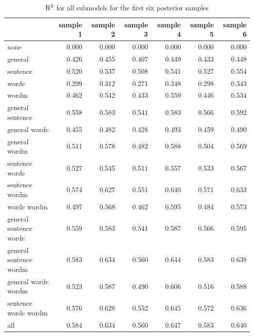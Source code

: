 \documentclass[11pt,a4paper,twoside]{book}\usepackage[]{graphicx}\usepackage[]{color}
\newenvironment{knitrout}{}{} %
\begin{document}
\begin{knitrout}
\color{fgcolor}\begin{table}

\caption{\label{tab:empirical.data.postsample3}$ \text{R}^2$ for all submodels for the first six posterior samples}
\centering
\begin{tabular}[t]{lrrrrrr}
\toprule
  & sample 1 & sample 2 & sample 3 & sample 4 & sample 5 & sample 6\\
\midrule
none & 0.000 & 0.000 & 0.000 & 0.000 & 0.000 & 0.000\\
general & 0.426 & 0.455 & 0.407 & 0.449 & 0.433 & 0.448\\
sentence & 0.520 & 0.537 & 0.508 & 0.541 & 0.527 & 0.554\\
wordc & 0.299 & 0.312 & 0.271 & 0.348 & 0.298 & 0.343\\
wordm & 0.462 & 0.542 & 0.433 & 0.559 & 0.446 & 0.534\\
general sentence & 0.558 & 0.583 & 0.541 & 0.583 & 0.566 & 0.592\\
general wordc & 0.455 & 0.482 & 0.428 & 0.493 & 0.459 & 0.490\\
general wordm & 0.511 & 0.578 & 0.482 & 0.588 & 0.504 & 0.569\\
sentence wordc & 0.527 & 0.545 & 0.511 & 0.557 & 0.533 & 0.567\\
sentence wordm & 0.574 & 0.627 & 0.551 & 0.640 & 0.571 & 0.633\\
wordc wordm & 0.497 & 0.568 & 0.462 & 0.595 & 0.484 & 0.573\\
general sentence wordc & 0.559 & 0.583 & 0.541 & 0.587 & 0.566 & 0.595\\
general sentence wordm & 0.583 & 0.634 & 0.560 & 0.644 & 0.583 & 0.638\\
general wordc wordm & 0.523 & 0.587 & 0.490 & 0.606 & 0.516 & 0.588\\
sentence wordc wordm & 0.576 & 0.628 & 0.552 & 0.645 & 0.572 & 0.636\\
all & 0.584 & 0.634 & 0.560 & 0.647 & 0.583 & 0.640\\
\bottomrule
\end{tabular}
\end{table}


\end{knitrout}
\end{document}
